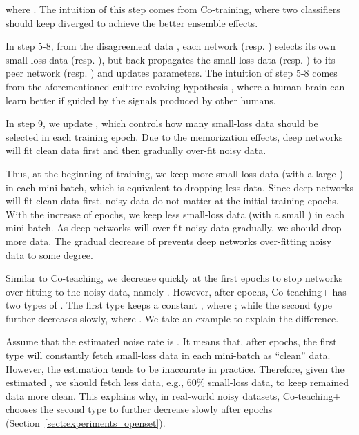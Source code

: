 \documentclass{article}
\begin{document}
where . The intuition of this step comes from Co-training, where two classifiers should keep diverged to achieve the better ensemble effects.

In step 5-8, from the disagreement data , each network  (resp. ) selects its own small-loss data  (resp. ), but back propagates the small-loss data  (resp. ) to its peer network  (resp. ) and updates parameters. The intuition of step 5-8 comes from the aforementioned culture evolving hypothesis \cite{bengio2014evolving}, where a human brain can learn better if guided by the signals produced by other humans.

In step 9, we update , which controls how many small-loss data should be selected in each training epoch. Due to the memorization effects, deep networks will fit clean data first and then gradually over-fit noisy data.

Thus, at the beginning of training, we keep more small-loss data (with a large ) in each mini-batch, which is equivalent to dropping less data. Since deep networks will fit clean data first, noisy data do not matter at the initial training epochs. With the increase of epochs, we keep less small-loss data (with a small ) in each mini-batch. As deep networks will over-fit noisy data gradually, we should drop more data. The gradual decrease of  prevents deep networks over-fitting noisy data to some degree.

Similar to Co-teaching, we decrease  quickly at the first  epochs to stop networks over-fitting to the noisy data, namely . However, after  epochs, Co-teaching+ has two types of . The first type keeps a constant , where ; while the second type further decreases  slowly, where . We take an example to explain the difference.

Assume that the estimated noise rate  is . It means that, after  epochs, the first type will constantly fetch  small-loss data in each mini-batch as ``clean'' data. However, the  estimation tends to be inaccurate in practice. Therefore, given the estimated , we should fetch less data, e.g., 60\% small-loss data, to keep remained data more clean. This explains why, in real-world noisy datasets, Co-teaching+ chooses the second type to further decrease  slowly after  epochs (Section~\ref{sect:experiments_openset}).
\end{document}
